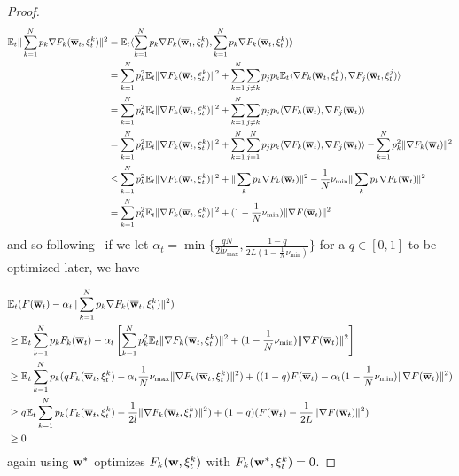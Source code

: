 \begin{proof}
	\begin{align*}
	\mathbb{E}_{t}\|\sum_{k=1}^{N}p_{k}\nabla F_{k}({\overline{\mathbf{w}}}_{t},\xi_{t}^{k})\|^{2} & =\mathbb{E}_{t}\langle\sum_{k=1}^{N}p_{k}\nabla F_{k}({\overline{\mathbf{w}}}_{t},\xi_{t}^{k}),\sum_{k=1}^{N}p_{k}\nabla F_{k}({\overline{\mathbf{w}}}_{t},\xi_{t}^{k})\rangle\\
	& =\sum_{k=1}^{N}p_{k}^{2}\mathbb{E}_{t}\|\nabla F_{k}({\overline{\mathbf{w}}}_{t},\xi_{t}^{k})\|^{2}+\sum_{k=1}^{N}\sum_{j\neq k}p_{j}p_{k}\mathbb{E}_{t}\langle\nabla F_{k}({\overline{\mathbf{w}}}_{t},\xi_{t}^{k}),\nabla F_{j}({\overline{\mathbf{w}}}_{t},\xi_{t}^{j})\rangle\\
	& =\sum_{k=1}^{N}p_{k}^{2}\mathbb{E}_{t}\|\nabla F_{k}({\overline{\mathbf{w}}}_{t},\xi_{t}^{k})\|^{2}+\sum_{k=1}^{N}\sum_{j\neq k}p_{j}p_{k}\langle\nabla F_{k}({\overline{\mathbf{w}}}_{t}),\nabla F_{j}({\overline{\mathbf{w}}}_{t})\rangle\\
	& =\sum_{k=1}^{N}p_{k}^{2}\mathbb{E}_{t}\|\nabla F_{k}({\overline{\mathbf{w}}}_{t},\xi_{t}^{k})\|^{2}+\sum_{k=1}^{N}\sum_{j=1}^{N}p_{j}p_{k}\langle\nabla F_{k}({\overline{\mathbf{w}}}_{t}),\nabla F_{j}({\overline{\mathbf{w}}}_{t})\rangle-\sum_{k=1}^{N}p_{k}^{2}\|\nabla F_{k}({\overline{\mathbf{w}}}_{t})\|^{2}\\
	& \leq\sum_{k=1}^{N}p_{k}^{2}\mathbb{E}_{t}\|\nabla F_{k}({\overline{\mathbf{w}}}_{t},\xi_{t}^{k})\|^{2}+\|\sum_{k}p_{k}\nabla F_{k}({\overline{\mathbf{w}}}_{t})\|^{2}-\frac{1}{N}\nu_{\min}\|\sum_{k}p_{k}\nabla F_{k}({\overline{\mathbf{w}}}_{t})\|^{2}\\
	& =\sum_{k=1}^{N}p_{k}^{2}\mathbb{E}_{t}\|\nabla F_{k}({\overline{\mathbf{w}}}_{t},\xi_{t}^{k})\|^{2}+(1-\frac{1}{N}\nu_{\min})\|\nabla F({\overline{\mathbf{w}}}_{t})\|^{2}
	\end{align*}
	and so following~\cite{ma2017power} if we let $\alpha_{t}=\min\{\frac{qN}{2l\nu_{\max}},\frac{1-q}{2L(1-\frac{1}{N}\nu_{\min})}\}$
	for a $q\in[0,1]$ to be optimized later, we have 
	
	\begin{align*}
	& \mathbb{E}_{t}(F({\overline{\mathbf{w}}}_{t})-\alpha_{t}\|\sum_{k=1}^{N}p_{k}\nabla F_{k}({\overline{\mathbf{w}}}_{t},\xi_{t}^{k})\|^{2})\\
	& \geq\mathbb{E}_{t}\sum_{k=1}^{N}p_{k}F_{k}({\overline{\mathbf{w}}}_{t})-\alpha_{t}\left[\sum_{k=1}^{N}p_{k}^{2}\mathbb{E}_{t}\|\nabla F_{k}({\overline{\mathbf{w}}}_{t},\xi_{t}^{k})\|^{2}+(1-\frac{1}{N}\nu_{\min})\|\nabla F({\overline{\mathbf{w}}}_{t})\|^{2}\right]\\
	& \geq\mathbb{E}_{t}\sum_{k=1}^{N}p_{k}(qF_{k}({\overline{\mathbf{w}}}_{t},\xi_{t}^{k})-\alpha_{t}\frac{1}{N}\nu_{\max}\|\nabla F_{k}({\overline{\mathbf{w}}}_{t},\xi_{t}^{k})\|^{2})+((1-q)F({\overline{\mathbf{w}}}_{t})-\alpha_{t}(1-\frac{1}{N}\nu_{\min})\|\nabla F({\overline{\mathbf{w}}}_{t})\|^{2})\\
	& \geq q\mathbb{E}_{t}\sum_{k=1}^{N}p_{k}(F_{k}({\overline{\mathbf{w}}}_{t},\xi_{t}^{k})-\frac{1}{2l}\|\nabla F_{k}({\overline{\mathbf{w}}}_{t},\xi_{t}^{k})\|^{2})+(1-q)(F({\overline{\mathbf{w}}}_{t})-\frac{1}{2L}\|\nabla F({\overline{\mathbf{w}}}_{t})\|^{2})\\
	& \geq0
	\end{align*}
	again using ${\mathbf{w}}^{\ast}$ optimizes $F_{k}({\mathbf{w}},\xi_{t}^{k})$ with $F_{k}({\mathbf{w}}^{\ast},\xi_{t}^{k})=0$. 
	

\end{proof}

